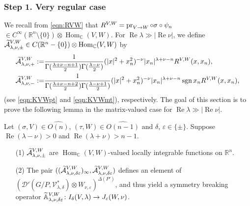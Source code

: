 \subsubsection{Step 1. Very regular case}
\label{subsec:Astep1}


We recall from \eqref{eqn:RVW}
 that 
$
R^{{V},{W}} = \operatorname{pr}_{{V}\to{W}} \circ \sigma \circ \psi_n$
$\in C^{\infty}({\mathbb{R}}^n \setminus \{0\}) \otimes
 {\operatorname{Hom}}_{\mathbb{C}}(V,W)$.  
For $\operatorname{Re}\lambda \gg |\operatorname{Re}\nu|$, 
 we define
$\widetilde{{\mathcal{A}}}_{{\lambda},{\nu},{\pm}}^{{V,W}}
 \in C({\mathbb{R}}^n - \{0\}) \otimes \operatorname{Hom}_{\mathbb{C}}(V,W)$
 by
\begin{alignat*}{2}
\widetilde{{\mathcal{A}}}_{{\lambda},{\nu},{+}}^{{V,W}}
:=&
\frac{1}{\Gamma(\frac{\lambda+\nu-n+1}{2})\Gamma(\frac{\lambda-\nu}{2})}
(|x|^2+x_n^2)^{-\nu} |x_n|^{\lambda+\nu-n}
R^{{V},{W}} (x,x_n), 
\\
\widetilde{{\mathcal{A}}}_{{\lambda},{\nu},{-}}^{{V,W}}
:=&
\frac{1}{\Gamma(\frac{\lambda+\nu-n+2}{2})\Gamma(\frac{\lambda-\nu+1}{2})}
(|x|^2+x_n^2)^{-\nu} |x_n|^{\lambda+\nu-n}
\operatorname{sgn} x_n
R^{{V},{W}} (x,x_n), 
\end{alignat*}
 (see \eqref{eqn:KVWpt} and \eqref{eqn:KVWmt}), 
 respectively.  
The goal of this section
 is to prove the following lemma
 in the matrix-valued case  
 for $\operatorname{Re} \lambda \gg |\operatorname{Re} \nu|$.  
\begin{lemma}
\label{lem:Astep1}
Let $(\sigma,V) \in \widehat {O(n)}$, 
 $(\tau,W) \in \widehat {O(n-1)}$
 and $\delta$, $\varepsilon \in \{ \pm \}$.  
Suppose $\operatorname{Re}\left(\lambda -\nu\right) >0$
 and $\operatorname{Re}\left(\lambda + \nu\right) > n-1$.  

\begin{enumerate}
\item[{\rm{(1)}}]
$\widetilde{{\mathcal{A}}}_{{\lambda},{\nu},{\pm}}^{{V,W}}$ are
 $\operatorname{Hom}_{\mathbb{C}}(V,W)$-valued
 locally integrable functions on ${\mathbb{R}}^n$.  

\item[{\rm{(2)}}]
The pair $((\widetilde{{\mathcal{A}}}_{{\lambda},{\nu},{\delta \varepsilon}}^{{V,W}})_{\infty}, \widetilde{{\mathcal{A}}}_{{\lambda},{\nu},{\delta \varepsilon}}^{{V,W}})$ defines an element
 of $({\mathcal{D}}'(G/P, {\mathcal{V}}_{\lambda,\delta}^{\ast}) \otimes W_{\nu,\varepsilon})^{\Delta(P')}$, 
 and thus yield a symmetry breaking operator
 ${\widetilde{\mathbb{A}}}_{{\lambda},{\nu},{\delta \varepsilon}}^{{V,W}}\colon I_{\delta}(V,\lambda) \to J_{\varepsilon}(W,\nu)$.  

\end{enumerate}
\end{lemma}



